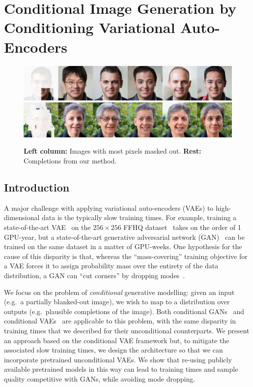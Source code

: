 \chapter{Conditional Image Generation by Conditioning Variational Auto-Encoders}
\label{ch:cigcvae}




\begin{figure}[b]
  \centering
  \includegraphics[width=\textwidth]{figs/cigcvae/qual/0_0_patches-4.png}
  \includegraphics[width=\textwidth]{figs/cigcvae/qual/59_2_3_modddd.png}
  \caption{\textbf{Left column:} Images with most pixels masked out.
    \textbf{Rest:} Completions from our method.
  }
  \label{fig:cigcvae-headline}
\end{figure}


\section{Introduction}
A major challenge with applying variational auto-encoders (VAEs) to
high-dimensional data is the typically slow training times. For example,
training a state-of-the-art VAE~\citep{vahdat2020nvae,child2020very} on the
$256\times256$ FFHQ dataset~\citep{karras2019style} takes on the order of 1
GPU-year, but a state-of-the-art generative adversarial network
(GAN)~\citep{lin2021anycost,karras2020analyzing} can be trained on the same
dataset in a matter of GPU-weeks. One hypothesis for the cause of this disparity
is that, whereas the ``mass-covering'' training objective for a VAE forces it to
assign probability mass over the entirety of the data distribution, a GAN can
``cut corners'' by dropping modes~\citep{arora2017gans,arora2017generalization}.

We focus on the problem of \textit{conditional} generative modelling: given an
input (e.g.~a partially blanked-out image), we wish to map to a distribution
over outputs (e.g.~plausible completions of the image). Both conditional
GANs~\citep{zheng2019pluralistic,zhao2021large} and conditional
VAEs~\citep{sohn2015learning,ivanov2018variational} are applicable to this
problem, with the same disparity in training times that we described for their
unconditional counterparts. We present an approach based on the conditional VAE
framework but, to mitigate the associated slow training times, we design the
architecture so that we can incorporate pretrained unconditional VAEs. We show
that re-using publicly available pretrained models in this way can lead to
training times and sample quality competitive with GANs, while avoiding mode
dropping.


